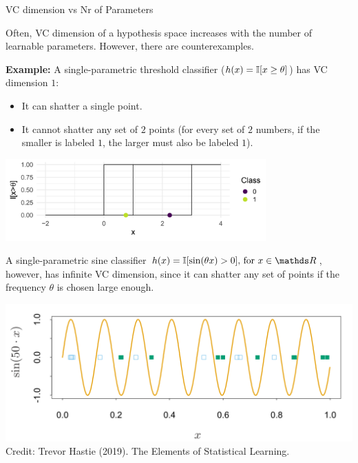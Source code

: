 \begin{vbframe}{VC dimension vs Nr of Parameters}

Often, VC dimension of a hypothesis space increases with the number of learnable parameters. However, there are counterexamples. 

\lz

\textbf{Example:}
A single-parametric threshold classifier ($h(x) = \mathbb{I}[x \ge \theta]$) has VC dimension $1$:
\begin{itemize}
\item It can shatter a single point.
\item It cannot shatter any set of $2$ points (for every set of $2$ numbers, if the smaller is labeled $1$, the larger must also be labeled $1$).
\end{itemize}


\begin{center}
\includegraphics[width = 10cm ]{figure_man/VC-example.png} \\
\end{center}


\framebreak



A single-parametric sine classifier $h(x) = \I[\sin(\theta x) > 0]\text{, for }x \in \R $, however, has infinite VC dimension, since it can shatter any set of points if the frequency $\theta$ is chosen large enough.

\center
\includegraphics{figure_man/vcdim_sine.png}\\
\tiny{Credit: Trevor Hastie (2019). The Elements of Statistical Learning.}
\normalsize
\end{vbframe}

